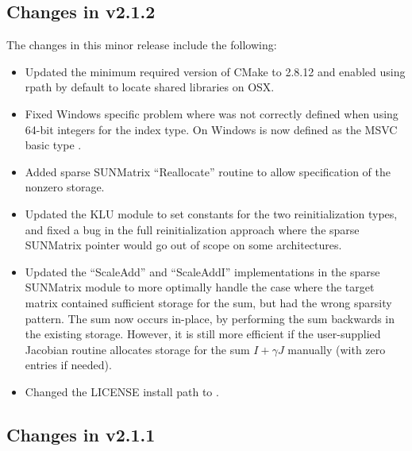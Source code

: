 \subsection*{Changes in v2.1.2}

The changes in this minor release include the following:
\begin{itemize}
\item Updated the minimum required version of CMake to 2.8.12 and enabled
  using rpath by default to locate shared libraries on OSX.
\item Fixed Windows specific problem where  was not correctly
  defined when using 64-bit integers for the {\sundials} index type. On Windows
   is now defined as the MSVC basic type .
\item Added sparse SUNMatrix ``Reallocate'' routine to allow specification of
  the nonzero storage.
\item Updated the KLU {\sunlinsol} module to set constants for the two
  reinitialization types, and fixed a bug in the full reinitialization
  approach where the sparse SUNMatrix pointer would go out of scope on
  some architectures.
\item Updated the ``ScaleAdd'' and ``ScaleAddI'' implementations in the
  sparse SUNMatrix module to more optimally handle the case where the
  target matrix contained sufficient storage for the sum, but had the
  wrong sparsity pattern.  The sum now occurs in-place, by performing
  the sum backwards in the existing storage.  However, it is still more
  efficient if the user-supplied Jacobian routine allocates storage for
  the sum $I+\gamma J$ manually (with zero entries if needed).
\item Changed the LICENSE install path to .
\end{itemize}

\subsection*{Changes in v2.1.1}

